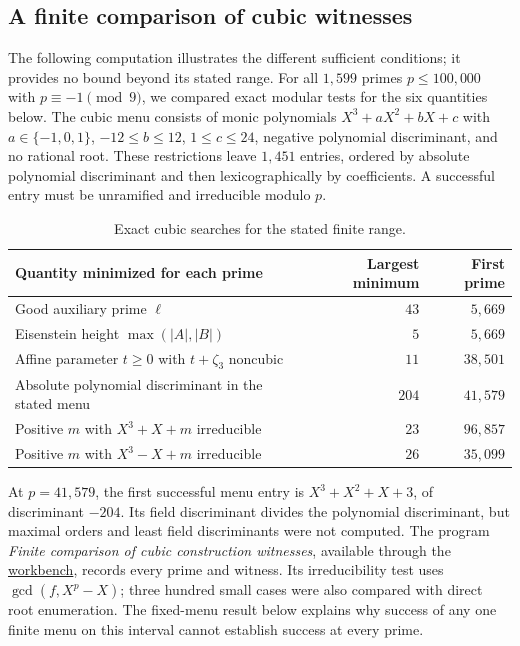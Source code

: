 \documentclass[11pt]{article}
\newcommand{\workbenchurl}{https://github.com/KokunoYumeto/zeta-and-l-functions-workbench}
\theoremstyle{definition}
\theoremstyle{remark}
\begin{document}
\subsection{A finite comparison of cubic witnesses}
The following computation illustrates the different sufficient conditions;
it provides no bound beyond its stated range.
For all $1{,}599$ primes $p\le100{,}000$ with $p\equiv-1\pmod9$,
we compared exact modular tests for the six quantities below.
The cubic menu consists of monic polynomials $X^3+aX^2+bX+c$ with
$a\in\{-1,0,1\}$, $-12\le b\le12$, $1\le c\le24$,
negative polynomial discriminant, and no rational root.
These restrictions leave $1{,}451$ entries, ordered by absolute
polynomial discriminant and then lexicographically by coefficients.
A successful entry must be unramified and irreducible modulo $p$.

\begin{table}[htbp]
\centering
\small
\begin{tabular}{@{}p{}rr@{}}
\toprule
Quantity minimized for each prime & Largest minimum & First prime\\
\midrule
Good auxiliary prime $\ell$ & $43$ & $5{,}669$\\
Eisenstein height $\max(|A|,|B|)$ & $5$ & $5{,}669$\\
Affine parameter $t\ge0$ with $t+\zeta_3$ noncubic & $11$ & $38{,}501$\\
Absolute polynomial discriminant in the stated menu & $204$ & $41{,}579$\\
Positive $m$ with $X^3+X+m$ irreducible & $23$ & $96{,}857$\\
Positive $m$ with $X^3-X+m$ irreducible & $26$ & $35{,}099$\\
\bottomrule
\end{tabular}
\caption{Exact cubic searches for the stated finite range.}
\label{tab:cubic-finite-probe}
\end{table}

At $p=41{,}579$, the first successful menu entry is
$X^3+X^2+X+3$, of discriminant $-204$.
Its field discriminant divides the polynomial discriminant, but
maximal orders and least field discriminants were not computed.
The program \emph{Finite comparison of cubic construction witnesses},
available through the \href{\workbenchurl}{workbench}, records every
prime and witness.  Its irreducibility test uses $\gcd(f,X^p-X)$;
three hundred small cases were also compared with direct root enumeration.
The fixed-menu result below explains why success of any one finite menu
on this interval cannot establish success at every prime.
\end{document}
